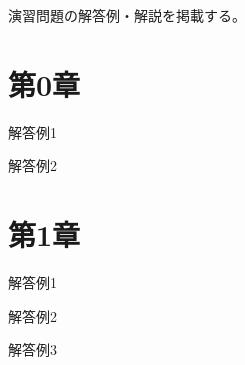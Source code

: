 演習問題の解答例・解説を掲載する。

\section*{第0章}
\begin{problems}
\item 解答例1
\item 解答例2
\end{problems}

\section*{第1章}
\begin{problems}
\item 解答例1
\item 解答例2
\item 解答例3
\end{problems}
